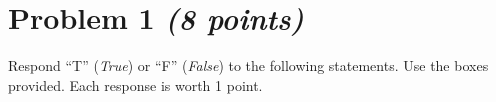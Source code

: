 \documentclass[11pt,twoside]{article}
\newcommand{\?}{\stackrel{?}{=}}
\newcommand{\gr}{\color{green!40!black}}
\begin{document}




 

  
  



\section*{Problem 1 \textit{(8 points)}}

Respond ``T'' ({\it True})  or  ``F'' (\textit{False}) to the following statements. Use the boxes provided. Each response is worth 1 point.
\end{document}
